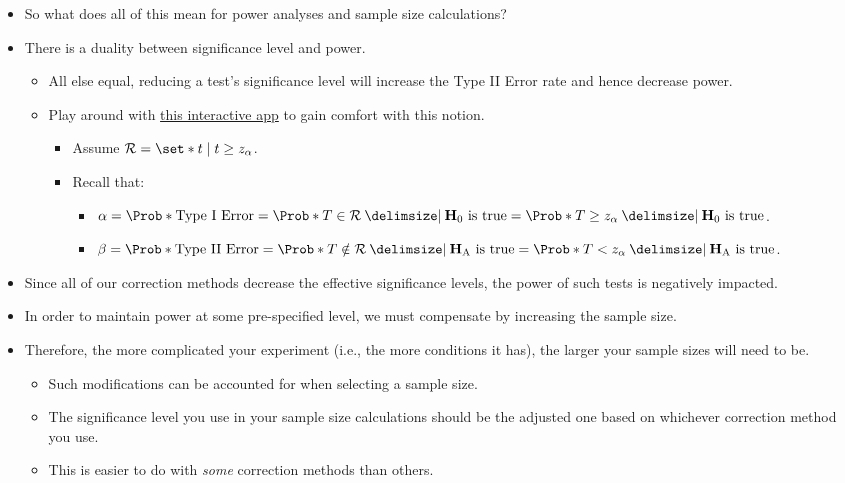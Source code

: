 \begin{itemize}
      \item So what does all of this mean for power analyses and sample size calculations?
      \item There is a duality between significance level and power.
            \begin{itemize}
                  \item All else equal, reducing a test's significance level will increase the Type II Error rate and hence
                        decrease power.
                  \item Play around with \href{https://nathaniel-t-stevens.shinyapps.io/ErrorIllustrator/}{this interactive app} to gain comfort with this notion.
                        \begin{itemize}
                              \item Assume $ \mathcal{R}=\set*{t\mid t\ge z_\alpha} $.
                              \item Recall that: \begin{itemize}
                                          \item $ \alpha=\Prob*{\text{Type I Error}}=\Prob*{T\in\mathcal{R}\given \text{$ \mathbf{H}_0 $ is true}}=\Prob*{T\ge z_\alpha\given \text{$ \mathbf{H}_0 $ is true}}$.
                                          \item $ \beta=\Prob*{\text{Type II Error}}=\Prob*{T\notin\mathcal{R}\given \text{$ \mathbf{H}_\text{A} $ is true}}=\Prob*{T< z_\alpha\given \text{$ \mathbf{H}_\text{A} $ is true}} $.
                                    \end{itemize}
                        \end{itemize}
            \end{itemize}
      \item Since all of our correction methods decrease the effective significance levels, the power of such tests is
            negatively impacted.
      \item In order to maintain power at some pre-specified level, we must compensate by increasing the sample
            size.
      \item Therefore, the more complicated your experiment (i.e., the more conditions it has), the larger your
            sample sizes will need to be.
            \begin{itemize}
                  \item Such modifications can be accounted for when selecting a sample size.
                  \item The significance level you use in your sample size calculations should be the adjusted one based
                        on whichever correction method you use.
                  \item This is easier to do with \emph{some} correction methods than others.
            \end{itemize}
\end{itemize}
